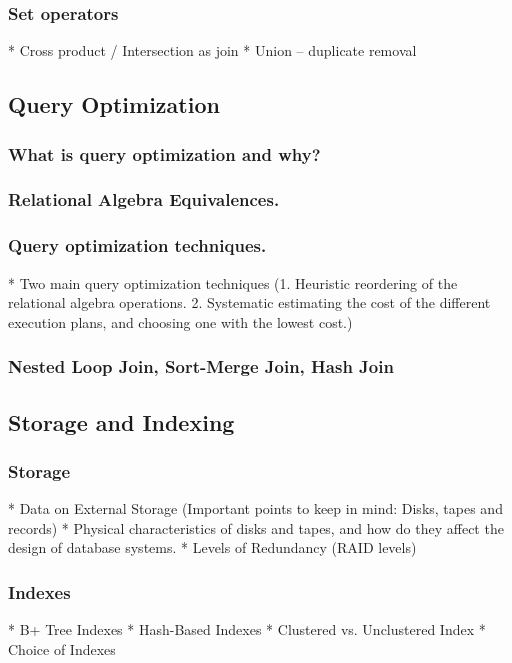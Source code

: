 \documentclass[a4paper,10pt,titlepage]{report}
\begin{document}
\subsubsection{Set operators}
     * Cross product / Intersection as join
     * Union -- duplicate removal
     
     
     
     
\subsection{Query Optimization}

\subsubsection{What is query optimization and why?}
\subsubsection{Relational Algebra Equivalences.}
\subsubsection{Query optimization techniques.}
	* Two main query optimization techniques (1. Heuristic reordering of the relational algebra operations. 2. Systematic estimating the cost of the different execution plans, and choosing one with the lowest cost.) 
\subsubsection{Nested Loop Join, Sort-Merge Join, Hash Join}


\newpage
\subsection{Storage and Indexing}

\subsubsection{Storage}
    * Data on External Storage (Important points to keep in mind: Disks, tapes and records)
    * Physical characteristics of disks and tapes, and how do they affect the design of database systems.
    * Levels of Redundancy (RAID levels)
\subsubsection{Indexes}
    * B+ Tree Indexes
    * Hash-Based Indexes
    * Clustered vs. Unclustered Index
    * Choice of Indexes
    
\end{document}
